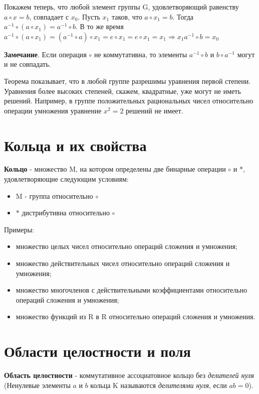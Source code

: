 \documentclass[a4paper]{article}
\begin{document}
{\begin{small}
Покажем теперь, что любой элемент группы G, удовлетворяющий равенству $a \circ x = b$, совпадает с $x_0$. Пусть $x_1$ таков, что $a \circ x_1 = b$. Тогда $a^{-1} \circ (a \circ x_1) = a^{-1} \circ b$. В то же время $a^{-1} \circ (a \circ x_1) = (a^{-1} \circ a) \circ x_1 = e \circ x_1 = e \circ x_1 = x_1 \Rightarrow x_1  a^{-1} \circ b = x_0$

\textbf{Замечание}. Если операция $\circ$  не коммутативна, то элементы $a^{-1} \circ b$ и $b \circ a^{-1}$ могут и не совпадать.


Теорема показывает, что в любой группе разрешимы уравнения первой
степени. Уравнения более высоких степеней, скажем, квадратные, уже могут не
иметь решений. Например, в группе положительных рациональных чисел
относительно операции умножения уравнение $x^2 = 2$ решений не имеет.



\section*{Кольца и их свойства}
\textbf{Кольцо} - множество M, на котором определены две бинарные операции $\circ$ и $*$, удовлетворяющие следующим условиям:
\begin{itemize}
\item M - группа относительно $\circ$
\item $*$ дистрибутивна относительно $\circ$
\end{itemize}

Примеры:
\begin{itemize}
\item множество целых чисел относительно операций сложения и умножения;
\item множество действительных чисел относительно операций сложения и
умножения;
\item множество многочленов с действительными коэффициентами
относительно операций сложения и умножения;
\item множество функций из R в R относительно операций сложения и умножения.
\end{itemize}

\section*{Области целостности и поля}
\textbf{Область целостности} - коммутативное ассоциатовное кольцо без \textit{делителей нуля} (Ненулевые элементы $a$ и $b$ кольца K называются \textit{делителями нуля}, если $ab = 0$).


\end{small}}
\end{document}
